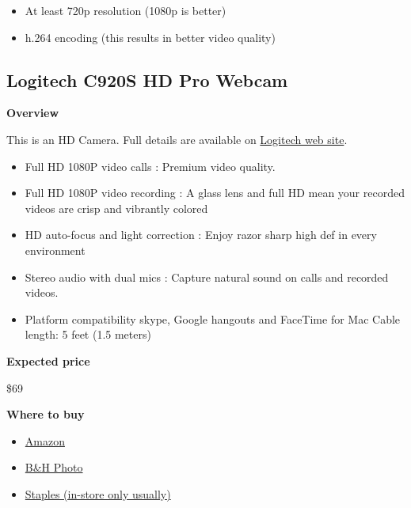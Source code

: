 \begin{itemize}
	\item At least 720p resolution (1080p is better)
	\item h.264 encoding (this results in better video quality)
\end{itemize}

\subsection{Logitech C920S HD Pro Webcam}
\label{sec:equipment::logitech-920}

\begin{gram}
\label{grm:equipment::logitech-920::main}
\textbf{Overview}

This is an HD Camera.  Full details are available on 
%
\href{https://www.logitech.com/en-us/product/hd-pro-webcam-c920s}{Logitech web site}.
%
\begin{itemize}
\item
Full HD 1080P video calls : Premium video quality.
\item
Full HD 1080P video recording : A glass lens and full HD mean your recorded videos are crisp and vibrantly colored
\item
HD auto-focus and light correction : Enjoy razor sharp high def in every environment

\item
Stereo audio with dual mics : Capture natural sound on calls and recorded videos. 

\item 
Platform compatibility skype, Google hangouts and FaceTime for Mac
Cable length: 5 feet (1.5 meters)
\end{itemize}


\textbf{Expected price}

\$69

\textbf{Where to buy}

\begin{itemize}
\item
\href{https://www.amazon.com/Logitech-Widescreen-Calling-Recording-Desktop/dp/B006JH8T3S/ref=sr_1_2?crid=2T6CQ3HNRR1XR&keywords=logitech+c920&qid=1582900645&s=electronics&sprefix=logitech+c,electronics,172&sr=1-2}{Amazon}
\item
\href{https://www.bhphotovideo.com/c/product/1461727-REG/logitech_960_001257_c920s_hd_pro_webcam.html}{B\&H Photo}
\item
\href{https://www.staples.com/logitech-c920s-pro-hd-webcam/product_24383955}{Staples (in-store only usually)}
\end{itemize}


\end{gram}
